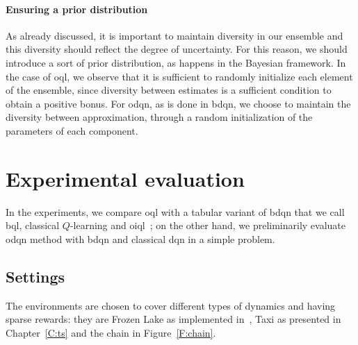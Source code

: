 \paragraph{Ensuring a prior distribution} As already discussed, it is important to maintain diversity in our ensemble and this diversity should reflect the degree of uncertainty. For this reason, we should introduce a sort of prior distribution, as happens in the Bayesian framework. In the case of \gls{oql}, we observe that it is sufficient to randomly initialize each element of the ensemble, since diversity between estimates is a sufficient condition to obtain a positive bonus.
For \gls{odqn}, as is done in \gls{bdqn}, we choose to maintain the diversity between approximation, through a random initialization of the parameters of each component.

\section{Experimental evaluation}
\label{S:odqn_experiments}
In the experiments, we compare \gls{oql} with a tabular variant of \gls{bdqn} that we call \gls{bql}, classical $Q$-learning and \gls{oiql}~\cite{sutton1998reinforcement}; on the other hand, we preliminarily evaluate \gls{odqn} method with \gls{bdqn} and classical \gls{dqn} in a simple problem.

\subsection{Settings}
The environments are chosen to cover different types of dynamics and having sparse rewards: they are Frozen Lake as implemented in~\cite{gym}, Taxi as presented in Chapter~\ref{C:ts} and the chain in Figure~\ref{F:chain}.

\begin{figure*}[t]
  \centering
  \caption{Structure of the Chain.}\label{F:chain}
\end{figure*}

